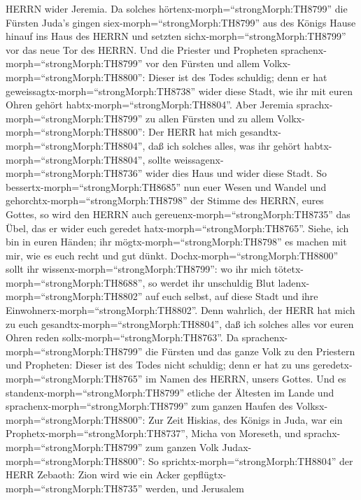 HERRN wider Jeremia.  Da solches
hörtenx-morph=``strongMorph:TH8799'' die Fürsten Juda's gingen
siex-morph=``strongMorph:TH8799'' aus des Königs Hause hinauf ins Haus
des HERRN und setzten sichx-morph=``strongMorph:TH8799'' vor das neue
Tor des HERRN.  Und die Priester und Propheten
sprachenx-morph=``strongMorph:TH8799'' vor den Fürsten und allem
Volkx-morph=``strongMorph:TH8800'': Dieser ist des Todes schuldig; denn
er hat geweissagtx-morph=``strongMorph:TH8738'' wider diese Stadt, wie
ihr mit euren Ohren gehört habtx-morph=``strongMorph:TH8804''.
 Aber Jeremia sprachx-morph=``strongMorph:TH8799'' zu allen
Fürsten und zu allem Volkx-morph=``strongMorph:TH8800'': Der HERR hat
mich gesandtx-morph=``strongMorph:TH8804'', daß ich solches alles, was
ihr gehört habtx-morph=``strongMorph:TH8804'', sollte
weissagenx-morph=``strongMorph:TH8736'' wider dies Haus und wider diese
Stadt.  So bessertx-morph=``strongMorph:TH8685'' nun euer
Wesen und Wandel und gehorchtx-morph=``strongMorph:TH8798'' der Stimme
des HERRN, eures Gottes, so wird den HERRN auch
gereuenx-morph=``strongMorph:TH8735'' das Übel, das er wider euch
geredet hatx-morph=``strongMorph:TH8765''.  Siehe, ich bin
in euren Händen; ihr mögtx-morph=``strongMorph:TH8798'' es machen mit
mir, wie es euch recht und gut dünkt. 
Dochx-morph=``strongMorph:TH8800'' sollt ihr
wissenx-morph=``strongMorph:TH8799'': wo ihr mich
tötetx-morph=``strongMorph:TH8688'', so werdet ihr unschuldig Blut
ladenx-morph=``strongMorph:TH8802'' auf euch selbst, auf diese Stadt und
ihre Einwohnerx-morph=``strongMorph:TH8802''. Denn wahrlich, der HERR
hat mich zu euch gesandtx-morph=``strongMorph:TH8804'', daß ich solches
alles vor euren Ohren reden sollx-morph=``strongMorph:TH8763''.
 Da sprachenx-morph=``strongMorph:TH8799'' die Fürsten und
das ganze Volk zu den Priestern und Propheten: Dieser ist des Todes
nicht schuldig; denn er hat zu uns geredetx-morph=``strongMorph:TH8765''
im Namen des HERRN, unsers Gottes.  Und es
standenx-morph=``strongMorph:TH8799'' etliche der Ältesten im Lande und
sprachenx-morph=``strongMorph:TH8799'' zum ganzen Haufen des
Volksx-morph=``strongMorph:TH8800'':  Zur Zeit Hiskias, des
Königs in Juda, war ein Prophetx-morph=``strongMorph:TH8737'', Micha von
Moreseth, und sprachx-morph=``strongMorph:TH8799'' zum ganzen Volk
Judax-morph=``strongMorph:TH8800'': So
sprichtx-morph=``strongMorph:TH8804'' der HERR Zebaoth: Zion wird wie
ein Acker gepflügtx-morph=``strongMorph:TH8735'' werden, und Jerusalem
